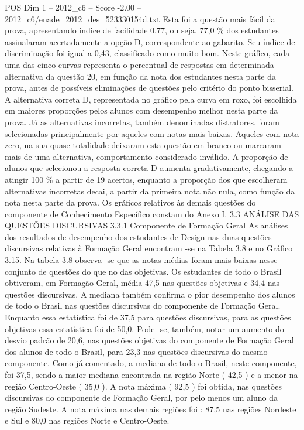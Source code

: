 \begin{textsample}{POS Dim 1 – 2012\_c6 – Score -2.00 – 2012\_c6/enade\_2012\_des\_523330154d.txt}
Esta foi a questão mais fácil da prova, apresentando índice de facilidade 0,77, ou seja, 77,0 \% dos estudantes assinalaram acertadamente a opção D, correspondente ao gabarito.
Seu índice de discriminação foi igual a 0,43, classificado como muito bom.
Neste gráfico, cada uma das cinco curvas representa o percentual de respostas em determinada alternativa da questão 20, em função da nota dos estudantes nesta parte da prova, antes de possíveis eliminações de questões pelo critério do ponto bisserial.
A alternativa correta D, representada no gráfico pela curva em roxo, foi escolhida em maiores proporções pelos alunos com desempenho melhor nesta parte da prova.
Já as alternativas incorretas, também denominadas distratores, foram selecionadas principalmente por aqueles com notas mais baixas.
Aqueles com nota zero, na sua quase totalidade deixaram esta questão em branco ou marcaram mais de uma alternativa, comportamento considerado inválido.
A proporção de alunos que selecionou a resposta correta D aumenta gradativamente, chegando a atingir 100 \% a partir de 19 acertos, enquanto a proporção dos que escolheram alternativas incorretas decai, a partir da primeira nota não nula, como função da nota nesta parte da prova.
Os gráficos relativos às demais questões do componente de Conhecimento Específico constam do Anexo I. 3.3 ANÁLISE DAS QUESTÕES DISCURSIVAS 3.3.1 Componente de Formação Geral As análises dos resultados de desempenho dos estudantes de Design nas duas questões discursivas relativas à Formação Geral encontram -se na Tabela 3.8 e no Gráfico 3.15.
Na tabela 3.8 observa -se que as notas médias foram mais baixas nesse conjunto de questões do que no das objetivas.
Os estudantes de todo o Brasil obtiveram, em Formação Geral, média 47,5 nas questões objetivas e 34,4 nas questões discursivas.
A mediana também confirma o pior desempenho dos alunos de todo o Brasil nas questões discursivas do componente de Formação Geral.
Enquanto essa estatística foi de 37,5 para questões discursivas, para as questões objetivas essa estatística foi de 50,0.
Pode -se, também, notar um aumento do desvio padrão de 20,6, nas questões objetivas do componente de Formação Geral dos alunos de todo o Brasil, para 23,3 nas questões discursivas do mesmo componente.
Como já comentado, a mediana de todo o Brasil, neste componente, foi 37,5, sendo a maior mediana encontrada na região Norte ( 42,5 ) e a menor na região Centro-Oeste ( 35,0 ).
A nota máxima ( 92,5 ) foi obtida, nas questões discursivas do componente de Formação Geral, por pelo menos um aluno da região Sudeste.
A nota máxima nas demais regiões foi : 87,5 nas regiões Nordeste e Sul e 80,0 nas regiões Norte e Centro-Oeste.

\end{textsample}
